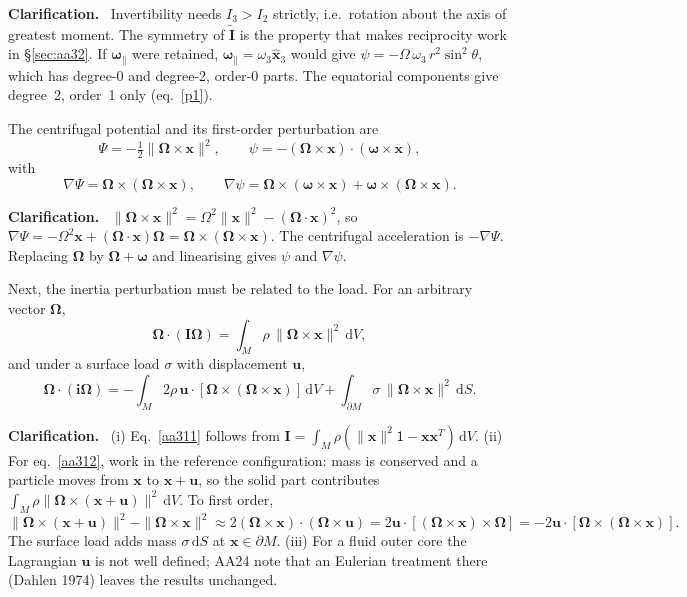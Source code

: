 \documentclass[11pt,a4paper]{article}
\newcommand{\bO}{\bm{\Omega}}
\newcommand{\bw}{\bm{\omega}}
\newcommand{\bx}{\mathbf{x}}
\newcommand{\bu}{\mathbf{u}}
\newcommand{\bI}{\mathbf{I}}
\newcommand{\bi}{\mathbf{i}}
\newcommand{\It}{\tilde{\mathbf{I}}}
\newcommand{\Id}{\mathsf{1}}
\newcommand{\dd}{\,\mathrm{d}}
\newcommand{\pM}{\partial M}
\renewenvironment{leftbar}{%
  \def\FrameCommand{{\color{clarbar}\vrule width 2.5pt}\hspace{8pt}}%
  \MakeFramed{\advance\hsize-\width\FrameRestore}}%
  {\endMakeFramed}
\newenvironment{clar}{\begin{leftbar}\small\noindent\textbf{Clarification.}\ }{\end{leftbar}}
\begin{document}
\begin{clar}
Invertibility needs $I_3>I_2$ strictly, i.e.\ rotation about the axis of greatest moment. The
symmetry of $\It$ is the property that makes reciprocity work in \S\ref{sec:aa32}. If $\bw_\parallel$
were retained, $\bw_\parallel=\omega_3\hat{\mathbf{x}}_3$ would give
$\psi=-\Omega\,\omega_3\,r^2\sin^2\theta$, which has degree-0 and degree-2, order-0 parts. The
equatorial components give degree~2, order~1 only (eq.~\ref{p1}).
\end{clar}

The centrifugal potential and its first-order perturbation are
\begin{equation}
  \Psi=-\tfrac12\|\bO\times\bx\|^2,\qquad \psi=-(\bO\times\bx)\cdot(\bw\times\bx),
  \tag{3.8--3.9}\label{aa39}
\end{equation}
with
\begin{equation}
  \nabla\Psi=\bO\times(\bO\times\bx),\qquad \nabla\psi=\bO\times(\bw\times\bx)+\bw\times(\bO\times\bx).
  \tag{3.10}\label{aa310}
\end{equation}

\begin{clar}
$\|\bO\times\bx\|^2=\Omega^2\|\bx\|^2-(\bO\cdot\bx)^2$, so
$\nabla\Psi=-\Omega^2\bx+(\bO\cdot\bx)\bO=\bO\times(\bO\times\bx)$. The centrifugal acceleration is
$-\nabla\Psi$. Replacing $\bO$ by $\bO+\bw$ and linearising gives $\psi$ and $\nabla\psi$.
\end{clar}

Next, the inertia perturbation must be related to the load. For an arbitrary vector $\bO$,
\begin{equation}
  \bO\cdot(\bI\bO)=\int_M\rho\,\|\bO\times\bx\|^2\dd V,
  \tag{3.11}\label{aa311}
\end{equation}
and under a surface load $\sigma$ with displacement $\bu$,
\begin{equation}
  \bO\cdot(\bi\bO)=-\int_M2\rho\,\bu\cdot[\bO\times(\bO\times\bx)]\dd V+\int_{\pM}\sigma\,\|\bO\times\bx\|^2\dd S .
  \tag{3.12}\label{aa312}
\end{equation}

\begin{clar}
(i) Eq.~\eqref{aa311} follows from $\bI=\int_M\rho(\|\bx\|^2\Id-\bx\bx^T)\dd V$. (ii) For
eq.~\eqref{aa312}, work in the reference configuration: mass is conserved and a particle moves from
$\bx$ to $\bx+\bu$, so the solid part contributes $\int_M\rho\|\bO\times(\bx+\bu)\|^2\dd V$. To first
order,
\begin{equation*}
  \|\bO\times(\bx+\bu)\|^2-\|\bO\times\bx\|^2\approx2(\bO\times\bx)\cdot(\bO\times\bu)=2\bu\cdot[(\bO\times\bx)\times\bO]=-2\bu\cdot[\bO\times(\bO\times\bx)].
\end{equation*}
The surface load adds mass $\sigma\dd S$ at $\bx\in\pM$. (iii) For a fluid outer core the Lagrangian
$\bu$ is not well defined; AA24 note that an Eulerian treatment there (Dahlen 1974) leaves the
results unchanged.
\end{clar}
\end{document}
